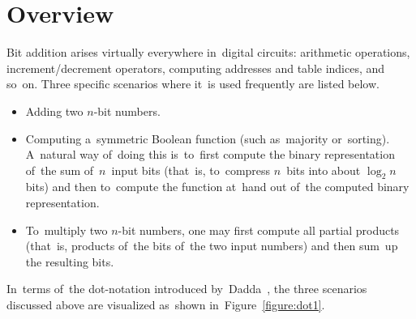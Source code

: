 \documentclass[sigconf, review, anonymous]{acmart}
\begin{document}
\maketitle

\section{Overview}
Bit addition arises virtually everywhere in~digital circuits:
arithmetic operations,
increment/decrement operators,
computing addresses and table indices, and so~on.
Three specific scenarios where it~is used frequently are listed below.
\begin{itemize}
	\item Adding two $n$-bit numbers.
	\item Computing a~symmetric Boolean function
		(such as~majority or~sorting).
		A~natural way of~doing this is~to~first compute
		the binary representation of~the sum of~$n$~input bits
		(that~is, to~compress $n$~bits into about $\log_2 n$ bits)
		and then to~compute the function at~hand
		out of~the computed binary representation.
	\item To~multiply two $n$-bit numbers, one may first compute
		all partial products (that~is, products of~the bits of~the 
		two input numbers) and then sum~up the resulting bits.
\end{itemize}
In~terms of~the dot-notation introduced by~Dadda~\cite{dadda}, the three scenarios discussed above are visualized as~shown in~Figure~\ref{figure:dot1}.

\end{document}
